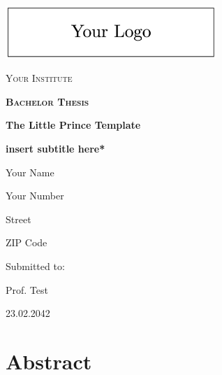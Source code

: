 \documentclass[12pt,titlepage, dvipsnames]{article}
\begin{document}

\begin{titlepage}
  \centering
  \includegraphics[width=8cm]{images/yourlogo.png}\par\vspace{1cm}
  \linespread{1}\Large{\scshape Your Institute\par}
  \vspace{1.5cm}
  {\scshape\Large\bfseries Bachelor Thesis\par}
  {\huge\bfseries The Little Prince Template \par
    \Large\bfseries *insert subtitle here*\par}
  \vspace{1.5cm}
  \linespread{0.75}\Large{Your Name\par Your Number\par Street\par ZIP Code}
  \vfill
  \linespread{0.75}\large{Submitted to:\par
    Prof. Test}
  \vfill
  {\large 23.02.2042\par}
\end{titlepage}


\section*{Abstract}
\lipsum[1] %



\newpage
\renewcommand{\contentsname}{Table of Contents}
\tableofcontents\thispagestyle{fancy}
{}

\newpage
\listoffigures\thispagestyle{fancy}
{}
\end{document}
